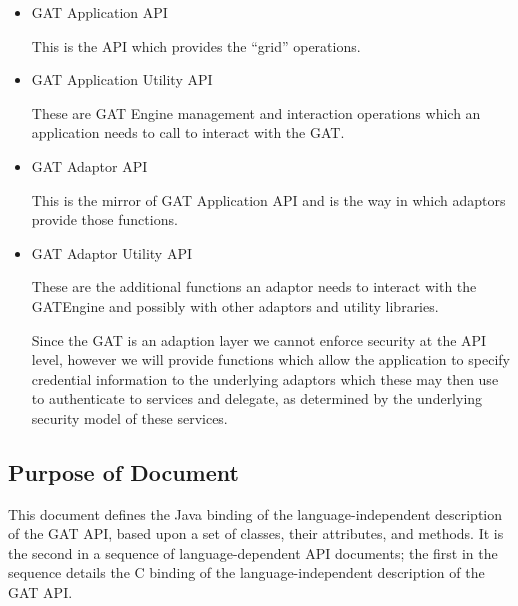 \documentclass[$Date: 2003/06/26 19:29:31 $]{glabarticle}
\begin{document}
\begin{itemize}
\item GAT Application API

      This is the API which provides the ``grid'' operations.

\item GAT Application Utility API

      These are GAT Engine management and interaction operations which
      an application needs to call to interact with the GAT.

\item  GAT Adaptor  API

      This is the mirror of GAT Application API and is the way in
      which adaptors provide those functions.

\item GAT Adaptor Utility API

      These are the additional functions an adaptor needs to interact
      with the GATEngine and possibly with other adaptors and utility
      libraries.

Since the GAT is an adaption layer we cannot enforce security at the
API level, however we will provide functions which allow the
application to specify credential information to the underlying
adaptors which these may then use to authenticate to services and
delegate, as determined by the underlying security model of these
services.

\end{itemize}


\subsection{Purpose of Document}

This document defines the Java binding of the language-independent description of the GAT
API, based upon a set of classes, their attributes, and methods.  It is the second in a sequence 
of language-dependent API documents; the first in the sequence details the C binding of the
language-independent description of the GAT API.

\end{document}
